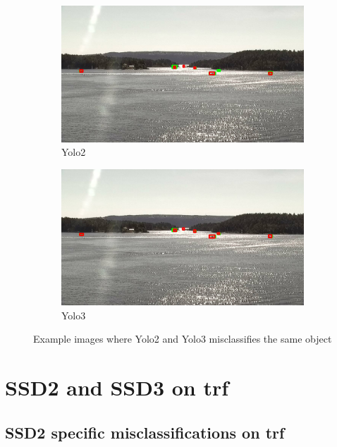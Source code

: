 \begin{figure}[h!]
\begin{subfigure}{.5\textwidth}
  \centering
  \includegraphics[width=0.9\linewidth]{results/case_buildings/yolo23/samemistake/yolo2/selected_08_11_frame3200.jpg}
  \caption{Yolo2}
\end{subfigure}%
\begin{subfigure}{.5\textwidth}
  \centering
  \includegraphics[width=.9\linewidth]{results/case_buildings/yolo23/samemistake/yolo3/selected_08_11_frame3200.jpg}
  \caption{Yolo3}
\end{subfigure}
\caption{Example images where Yolo2 and Yolo3 misclassifies the same object}
\label{img:yolo2_better}

\end{figure}

\newpage

\section{SSD2 and SSD3 on trf}

\subsection{SSD2 specific misclassifications on trf}
\label{sec:trf_ssd_bigbox}

